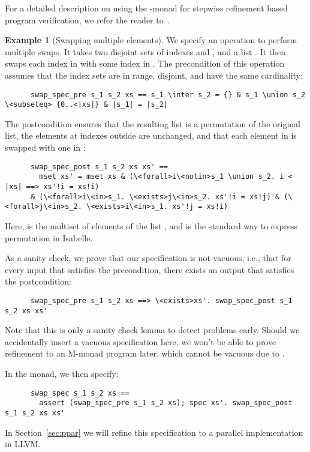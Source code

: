 \documentclass[sn-mathphys,Numbered]{sn-jnl}
\theoremstyle{thmstyleone}%
\theoremstyle{definition}%
\newtheorem{example}{Example}%
\theoremstyle{thmstylethree}%
\begin{document}
  For a detailed description on using the -monad for stepwise refinement based program verification, we refer the reader to~\cite{LaTu12}.

  \begin{example}[Swapping multiple elements]\label{ex:swap_spec}
    We specify an operation to perform multiple swaps. It takes two disjoint sets of indexes  and , and a list . It then swaps each index in  with some index in .
    The precondition of this operation assumes that the index sets are in range, disjoint, and have the same cardinality:
    \begin{lstlisting}
      swap_spec_pre s_1 s_2 xs == s_1 \inter s_2 = {} & s_1 \union s_2 \<subseteq> {0..<|xs|} & |s_1| = |s_2|
    \end{lstlisting}
    The postcondition ensures that the resulting list is a permutation of the original list,
    the elements at indexes outside  are unchanged, and that each element in  is swapped with one in :
    \begin{lstlisting}
      swap_spec_post s_1 s_2 xs xs' ==
        mset xs' = mset xs & (\<forall>i\<notin>s_1 \union s_2. i < |xs| ==> xs'!i = xs!i)
      & (\<forall>i\<in>s_1. \<exists>j\<in>s_2. xs'!i = xs!j) & (\<forall>j\<in>s_2. \<exists>i\<in>s_1. xs'!j = xs!i)
    \end{lstlisting}
    Here,  is the multiset of elements of the list , and  is the standard way to express permutation in Isabelle.

    As a sanity check, we prove that our specification is not vacuous, i.e., that for every input that satisfies the precondition, there
    exists an output that satisfies the postcondition:
    \begin{lstlisting}
      swap_spec_pre s_1 s_2 xs ==> \<exists>xs'. swap_spec_post s_1 s_2 xs xs'
    \end{lstlisting}
    Note that this is only a sanity check lemma to detect problems early.
    Should we accidentally insert a vacuous specification here, we won't be able to prove refinement to an M-monad program later, which cannot be vacuous due to .

    In the  monad, we then specify:
    \begin{lstlisting}
      swap_spec s_1 s_2 xs ==
        assert (swap_spec_pre s_1 s_2 xs); spec xs'. swap_spec_post s_1 s_2 xs xs'
    \end{lstlisting}
%
    In Section~\ref{sec:ppar} we will refine this specification to a parallel implementation in LLVM.
  \end{example}
\end{document}
